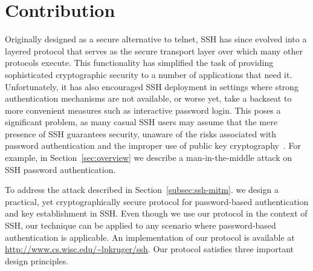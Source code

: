 \section{Contribution}
\label{sec:intro}


Originally designed as a secure alternative to telnet, SSH has since
evolved into a layered protocol that serves as the secure transport
layer over which many other protocols execute. This functionality has
simplified the task of providing sophisticated cryptographic security
to a number of applications that need it. Unfortunately, it has also
encouraged SSH deployment in settings where strong authentication
mechanisms are not available, or worse yet, take a backseat to more
convenient measures such as interactive password login. This poses a
significant problem, as many casual SSH users may assume that the mere
presence of SSH guarantees security, unaware of the risks associated
with password authentication and the improper use of public key
cryptography~\cite{DBLP:journals/compsec/YangS99}. For example, in
Section~\ref{sec:overview} we describe a man-in-the-middle attack on
SSH password authentication.

\vspace{1ex}
\noindent
To address the attack described in Section~\ref{subsec:ssh-mitm}.  we
design a practical, yet cryptographically secure protocol for
password-based authentication and key establishment in SSH.  Even though
we use our protocol in the context of SSH, our technique can be applied 
to any scenario where password-based authentication is applicable. An
implementation of our protocol is available at \url{http://www.cs.wisc.edu/~lpkruger/ssh}. Our protocol
satisfies three important design principles.

